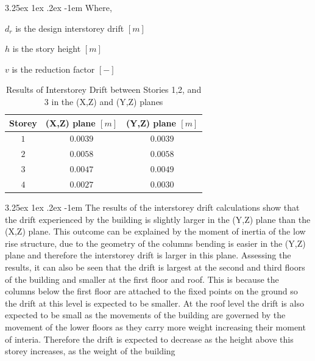 \documentclass[11pt,a4paper,titlepage]{report}
\makeatletter
\renewcommand\paragraph{\@startsection{paragraph}{5}{\z@}%
  {3.25ex \@plus1ex \@minus.2ex}%
  {-1em}%
  {\normalfont\normalsize\bfseries}}
\makeatother
\begin{document}
\paragraph{}Where,
\begin{itemize}
\begin{small}
    \item $d_r$ is the design interstorey drift $[m]$
    \item $h$ is the story height $[m]$
    \item $v$ is the reduction factor $[-]$
\end{small}
\end{itemize}
\begin{table}[h]
    \centering
    \begin{tabular}{c|c|c}
       Storey  & (X,Z) plane $[m]$ & (Y,Z) plane $[m]$ \\
       \hline
       $1$  & $0.0039$ & $0.0039$ \\
       $2$ & $0.0058$ & $0.0058$ \\
       $3$ & $0.0047$ & $0.0049$ \\
       $4$ & $0.0027$ & $0.0030$ \\
    \end{tabular}
    \caption{Results of Interstorey Drift between Stories 1,2, and 3 in the (X,Z) and (Y,Z) planes}
    \label{tab:interstorey drift}
\end{table}
\paragraph{}The results of the interstorey drift calculations show that the drift experienced by the building is slightly larger in the (Y,Z) plane than the (X,Z) plane. This outcome can be explained by the moment of inertia of the low rise structure, due to the geometry of the columns bending is easier in the (Y,Z) plane and therefore the interstorey drift is larger in this plane. Assessing the results, it can also be seen that the drift is largest at the second and third floors of the building and smaller at the first floor and roof. This is because the columns below the first floor are attached to the fixed points on the ground so the drift at this level is expected to be smaller. At the roof level the drift is also expected to be small as the movements of the building are governed by the movement of the lower floors as they carry more weight increasing their moment of interia. Therefore the drift is expected to decrease as the height above this storey increases, as the weight of the building
\end{document}
